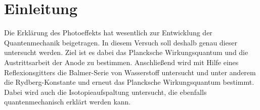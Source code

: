 \section{Einleitung}
Die Erklärung des Photoeffekts hat wesentlich zur Entwicklung der Quantenmechanik beigetragen.
In diesem Versuch soll deshalb genau dieser untersucht werden. Ziel ist es dabei das Plancksche Wirkungsquantum und die Austrittsarbeit der Anode zu bestimmen. Anschließend wird mit Hilfe eines Reflexionsgitters die Balmer-Serie von Wasserstoff untersucht und unter anderem die Rydberg-Konstante und erneut das Plancksche Wirkungsquantum bestimmt. Dabei wird auch die Isotopieaufspaltung untersucht, die ebenfalls quantenmechanisch erklärt werden kann.
